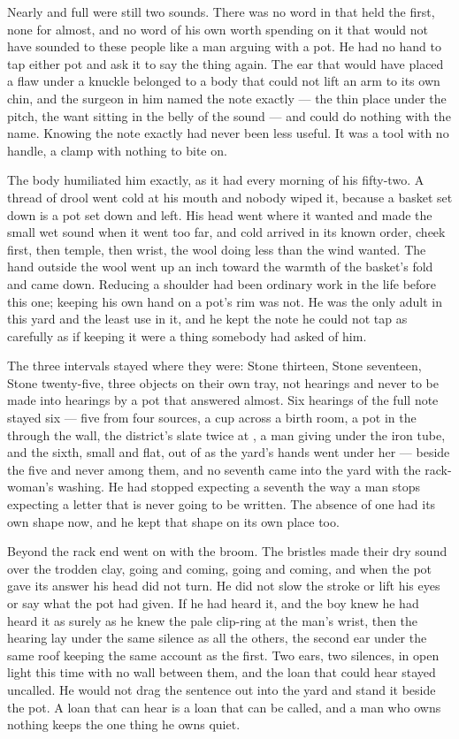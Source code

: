 Nearly and full were still two sounds. There was no word in  that held the first, none for almost, and no word of his own worth spending on it that would not have sounded to these people like a man arguing with a pot. He had no hand to tap either pot and ask it to say the thing again. The ear that would have placed a flaw under a knuckle belonged to a body that could not lift an arm to its own chin, and the surgeon in him named the note exactly --- the thin place under the pitch, the want sitting in the belly of the sound --- and could do nothing with the name. Knowing the note exactly had never been less useful. It was a tool with no handle, a clamp with nothing to bite on.

The body humiliated him exactly, as it had every morning of his fifty-two. A thread of drool went cold at his mouth and nobody wiped it, because a basket set down is a pot set down and left. His head went where it wanted and made the small wet sound when it went too far, and cold arrived in its known order, cheek first, then temple, then wrist, the wool doing less than the wind wanted. The hand outside the wool went up an inch toward the warmth of the basket's fold and came down. Reducing a shoulder had been ordinary work in the life before this one; keeping his own hand on a pot's rim was not. He was the only adult in this yard and the least use in it, and he kept the note he could not tap as carefully as if keeping it were a thing somebody had asked of him.

\scenebreak

The three intervals stayed where they were: Stone thirteen, Stone seventeen, Stone twenty-five, three objects on their own tray, not hearings and never to be made into hearings by a pot that answered almost. Six hearings of the full note stayed six --- five from four sources, a cup across a birth room, a pot in the  through the wall, the district's slate twice at , a man giving under the iron tube, and the sixth, small and flat, out of  as the yard's hands went under her --- beside the five and never among them, and no seventh came into the yard with the rack-woman's washing. He had stopped expecting a seventh the way a man stops expecting a letter that is never going to be written. The absence of one had its own shape now, and he kept that shape on its own place too.

Beyond the rack end  went on with the broom. The bristles made their dry sound over the trodden clay, going and coming, going and coming, and when the pot gave its answer his head did not turn. He did not slow the stroke or lift his eyes or say what the pot had given. If he had heard it, and the boy knew he had heard it as surely as he knew the pale clip-ring at the man's wrist, then the hearing lay under the same silence as all the others, the second ear under the same roof keeping the same account as the first. Two ears, two silences, in open light this time with no wall between them, and the loan that could hear stayed uncalled. He would not drag the sentence out into the yard and stand it beside the pot. A loan that can hear is a loan that can be called, and a man who owns nothing keeps the one thing he owns quiet.

